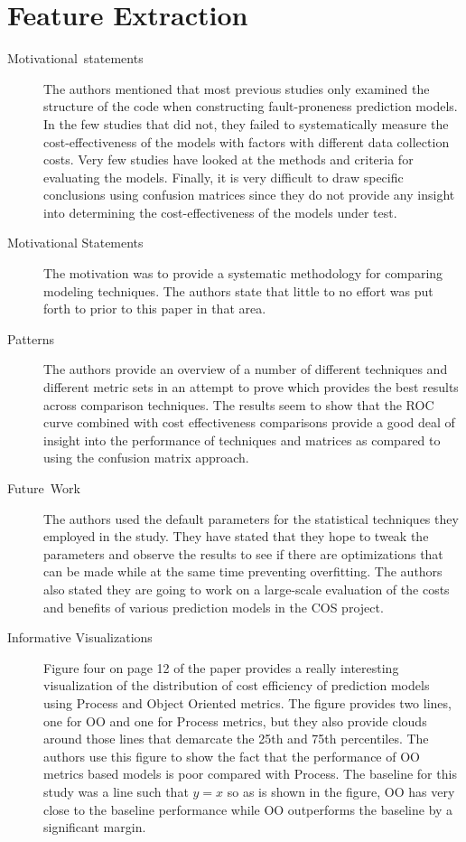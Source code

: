\documentclass[english]{article}
\begin{document}
\section*{Feature Extraction}
\begin{description}
\item [{Motivational~statements}] The authors mentioned that most previous
studies only examined the structure of the code when constructing
fault-proneness prediction models. In the few studies that did not,
they failed to systematically measure the cost-effectiveness of the
models with factors with different data collection costs. Very few
studies have looked at the methods and criteria for evaluating the
models. Finally, it is very difficult to draw specific conclusions
using confusion matrices since they do not provide any insight into
determining the cost-effectiveness of the models under test.
\item [{Motivational Statements}] The motivation was to provide a systematic
methodology for comparing modeling techniques. The authors state that
little to no effort was put forth to prior to this paper in that area.
\item [{Patterns}] The authors provide an overview of a number of different
techniques and different metric sets in an attempt to prove which
provides the best results across comparison techniques. The results
seem to show that the ROC curve combined with cost effectiveness comparisons
provide a good deal of insight into the performance of techniques
and matrices as compared to using the confusion matrix approach.
\item [{Future~Work}] The authors used the default parameters for the
statistical techniques they employed in the study. They have stated
that they hope to tweak the parameters and observe the results to
see if there are optimizations that can be made while at the same
time preventing overfitting. The authors also stated they are going
to work on a large-scale evaluation of the costs and benefits of various
prediction models in the COS project.
\item [{Informative Visualizations}] Figure four on page 12 of the paper
provides a really interesting visualization of the distribution of
cost efficiency of prediction models using Process and Object Oriented
metrics. The figure provides two lines, one for OO and one for Process
metrics, but they also provide clouds around those lines that demarcate
the 25th and 75th percentiles. The authors use this figure to show
the fact that the performance of OO metrics based models is poor compared
with Process. The baseline for this study was a line such that $y=x$
so as is shown in the figure, OO has very close to the baseline performance
while OO outperforms the baseline by a significant margin. 
\end{description}
\end{document}

